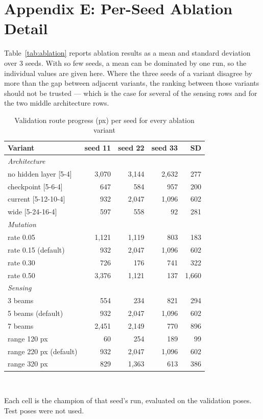 \documentclass[conference]{IEEEtran}
\begin{document}
\section*{Appendix E: Per-Seed Ablation Detail}

\label{sec:appSeeds}

Table~\ref{tab:ablation} reports ablation results as a mean and standard deviation over 3 seeds. With so few seeds, a mean can be dominated by one run, so the individual values are given here. Where the three seeds of a variant disagree by more than the gap between adjacent variants, the ranking between those variants should not be trusted — which is the case for several of the sensing rows and for the two middle architecture rows.

\begin{table}[!t]
\caption{Validation route progress (px) per seed for every ablation variant}
\label{tab:seeds}
\centering
\footnotesize
\begin{tabular}{lrrrr}
\toprule
Variant & seed 11 & seed 22 & seed 33 & SD \\
\midrule
\multicolumn{5}{l}{\emph{Architecture}} \\
no hidden layer [5-4] & 3,070 & 3,144 & 2,632 & 277 \\
checkpoint [5-6-4] & 647 & 584 & 957 & 200 \\
current [5-12-10-4] & 932 & 2,047 & 1,096 & 602 \\
wide [5-24-16-4] & 597 & 558 & 92 & 281 \\
\multicolumn{5}{l}{\emph{Mutation}} \\
rate 0.05 & 1,121 & 1,119 & 803 & 183 \\
rate 0.15 (default) & 932 & 2,047 & 1,096 & 602 \\
rate 0.30 & 726 & 176 & 741 & 322 \\
rate 0.50 & 3,376 & 1,121 & 137 & 1,660 \\
\multicolumn{5}{l}{\emph{Sensing}} \\
3 beams & 554 & 234 & 821 & 294 \\
5 beams (default) & 932 & 2,047 & 1,096 & 602 \\
7 beams & 2,451 & 2,149 & 770 & 896 \\
range 120 px & 60 & 254 & 189 & 99 \\
range 220 px (default) & 932 & 2,047 & 1,096 & 602 \\
range 320 px & 829 & 1,363 & 613 & 386 \\
\bottomrule
\end{tabular}
\\[2pt]\parbox{\linewidth}{\scriptsize Each cell is the champion of that seed's run, evaluated on the validation poses. Test poses were not used.}
\end{table}
\end{document}
